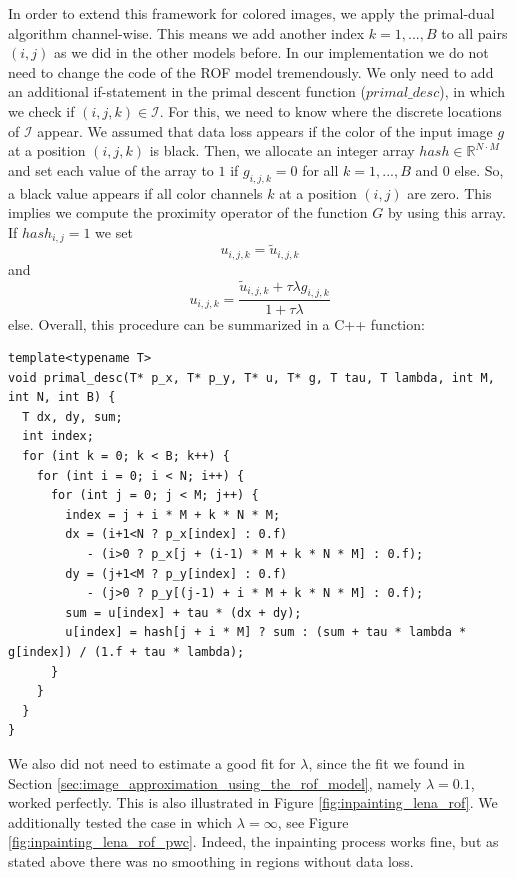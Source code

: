 \documentclass[abstracton]{scrreprt}
\begin{document}
        In order to extend this framework for colored images, we apply the primal-dual algorithm channel-wise. This means we add another index $k = 1, ..., B$ to all pairs $(i,j)$ as we did in the other models before. In our implementation we do not need to change the code of the ROF model tremendously. We only need to add an additional if-statement in the primal descent function ($primal\_desc$), in which we check if $(i,j,k) \in \mathcal{I}$. For this, we need to know where the discrete locations of $\mathcal{I}$ appear. We assumed that data loss appears if the color of the input image $g$ at a position $(i,j,k)$ is black. Then, we allocate an integer array $hash \in \mathbb{R}^{N \cdot M}$ and set each value of the array to $1$ if $g_{i,j,k} = 0$ for all $k = 1, ..., B$ and $0$ else. So, a black value appears if all color channels $k$ at a position $(i,j)$ are zero. This implies we compute the proximity operator of the function $G$ by using this array. If $hash_{i,j} = 1$ we set
            $$
                u_{i,j,k} = \tilde{u}_{i,j,k}
            $$
        and
            $$
                u_{i,j,k} = \frac{\tilde{u}_{i,j,k} + \tau \lambda g_{i,j,k}}{1 + \tau\lambda}
            $$
        else. Overall, this procedure can be summarized in a C++ function:
        \begin{lstlisting}
template<typename T>
void primal_desc(T* p_x, T* p_y, T* u, T* g, T tau, T lambda, int M, int N, int B) {
  T dx, dy, sum;
  int index;
  for (int k = 0; k < B; k++) {
    for (int i = 0; i < N; i++) {
      for (int j = 0; j < M; j++) {
        index = j + i * M + k * N * M;
        dx = (i+1<N ? p_x[index] : 0.f)
           - (i>0 ? p_x[j + (i-1) * M + k * N * M] : 0.f);
        dy = (j+1<M ? p_y[index] : 0.f)
           - (j>0 ? p_y[(j-1) + i * M + k * N * M] : 0.f);
        sum = u[index] + tau * (dx + dy);
        u[index] = hash[j + i * M] ? sum : (sum + tau * lambda * g[index]) / (1.f + tau * lambda);
      }
    }
  }
}
        \end{lstlisting}
        We also did not need to estimate a good fit for $\lambda$, since the fit we found in Section \ref{sec:image_approximation_using_the_rof_model}, namely $\lambda = 0.1$, worked perfectly. This is also illustrated in Figure \ref{fig:inpainting_lena_rof}. We additionally tested the case in which $\lambda = \infty$, see Figure \ref{fig:inpainting_lena_rof_pwc}. Indeed, the inpainting process works fine, but as stated above there was no smoothing in regions without data loss.
\end{document}
